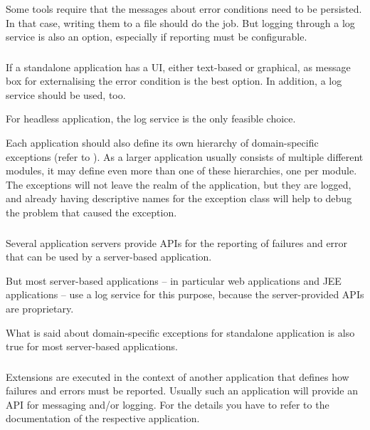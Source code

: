 Some tools require that the messages about error conditions need to be persisted. In that case, writing them to a file should do the job. But logging through a log service is also an option, especially if reporting  must be configurable.

\subsubsection{}
If a standalone application has a UI, either text-based or graphical, as message box for externalising the error condition is the best option. In addition, a log service should be used, too.

For headless application, the log service is the only feasible choice.

Each application should also define its own hierarchy of domain-specific exceptions (refer to ). As a larger application usually consists of multiple different modules, it may define even more than one of these hierarchies, one per module. The exceptions will not leave the realm of the application, but they are logged, and already having descriptive names for the exception class will help to debug the problem that caused the exception.
 
\subsubsection{}
Several application servers provide APIs for the reporting of failures and error that can be used by a server-based application.

But most server-based applications – in particular web applications and JEE applications – use a log service for this purpose, because the server-provided APIs are proprietary. 

What is said about domain-specific exceptions for standalone application is also true for most server-based applications.

\subsubsection{}
Extensions are executed in the context of another application that defines how failures and errors must be reported. Usually such an application will provide an API for messaging and/or logging. For the details you have to refer to the documentation of the respective application.

